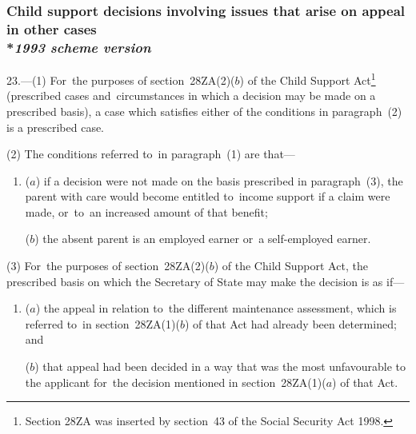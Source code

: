 \documentclass[12pt,a4paper]{article}
\begin{document}

\subsubsection[23. Child support decisions involving issues that arise on appeal in other cases --- \emph{1993 scheme version}]{Child support decisions involving issues that arise on appeal in other cases\\*\emph{1993 scheme version}}

23.—(1) For~the purposes of section~28ZA(2)($b$) of the Child Support Act\footnote{\frenchspacing Section 28ZA was inserted by section~43 of the Social Security Act 1998.} (prescribed cases and~circumstances in which a decision may be made on a prescribed basis), a case which satisfies either of the conditions in paragraph~(2) is a prescribed case.

(2) The conditions referred to~in paragraph~(1) are that—
\begin{enumerate}\item[]
($a$) if a decision were not made on the basis prescribed in paragraph~(3), the parent with care would become entitled to~income support if a claim were made, or~to~an increased amount of that benefit;

($b$) the absent parent is an employed earner or~a self-employed earner.
\end{enumerate}

(3) For~the purposes of section~28ZA(2)($b$) of the Child Support Act, the prescribed basis on which the Secretary of State may make the decision is as if—
\begin{enumerate}\item[]
($a$) the appeal in relation to~the different maintenance assessment, which is referred to~in section~28ZA(1)($b$) of that Act had already been determined; and

($b$) that appeal had been decided in a way that was the most unfavourable to the applicant for~the decision mentioned in section~28ZA(1)($a$) of that Act.
\end{enumerate}
\end{document}
